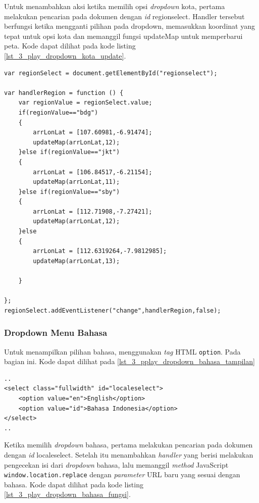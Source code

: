 Untuk menambahkan aksi ketika memilih opsi \textit{dropdown} kota, pertama melakukan pencarian pada dokumen dengan \textit{id} regionselect. Handler tersebut berfungsi ketika mengganti pilihan pada dropdown, memasukkan koordinat yang tepat untuk opsi kota dan memanggil fungsi updateMap untuk memperbarui peta. Kode dapat dilihat pada kode listing \ref{lst_3_play_dropdown_kota_update}.

\begin{lstlisting}[caption=Fungsi JavaScript untuk menambahkan \textit{handler} ketika mengganti \textit{dropdown} kota ,label = {lst_3_play_dropdown_kota_update}]
var regionSelect = document.getElementById("regionselect");

var handlerRegion = function () {
    var regionValue = regionSelect.value;
    if(regionValue=="bdg")
    {
        arrLonLat = [107.60981,-6.91474];
        updateMap(arrLonLat,12);
    }else if(regionValue=="jkt")
    {
        arrLonLat = [106.84517,-6.21154];
        updateMap(arrLonLat,11);
    }else if(regionValue=="sby")
    {
        arrLonLat = [112.71908,-7.27421];
        updateMap(arrLonLat,12);
    }else
    {
        arrLonLat = [112.6319264,-7.9812985];
        updateMap(arrLonLat,13);

    }

};
regionSelect.addEventListener("change",handlerRegion,false);
\end{lstlisting}

\subsubsection{Dropdown Menu Bahasa}
Untuk menampilkan pilihan bahasa, menggunakan \textit{tag} HTML \verb!option!. Pada bagian ini. Kode dapat dilihat pada \ref{lst_3_pplay_dropdown_bahasa_tampilan}

\begin{lstlisting}[caption=Menampilkan pilihan bahasa kepada pengguna ,label = {lst_3_play_dropdown_bahasa_tampilan}]
..
<select class="fullwidth" id="localeselect">
    <option value="en">English</option>
    <option value="id">Bahasa Indonesia</option>
</select>
..
\end{lstlisting}

Ketika memilih \textit{dropdown} bahasa, pertama melakukan pencarian pada dokumen dengan \textit{id} localeselect. Setelah itu menambahkan \textit{handler} yang berisi melakukan pengecekan isi dari \textit{dropdown} bahasa, lalu memanggil \textit{method} JavaScript \verb!window.location.replace! dengan \textit{parameter} URL baru yang sesuai dengan bahasa. Kode dapat dilihat pada kode listing \ref{lst_3_play_dropdown_bahasa_fungsi}.

